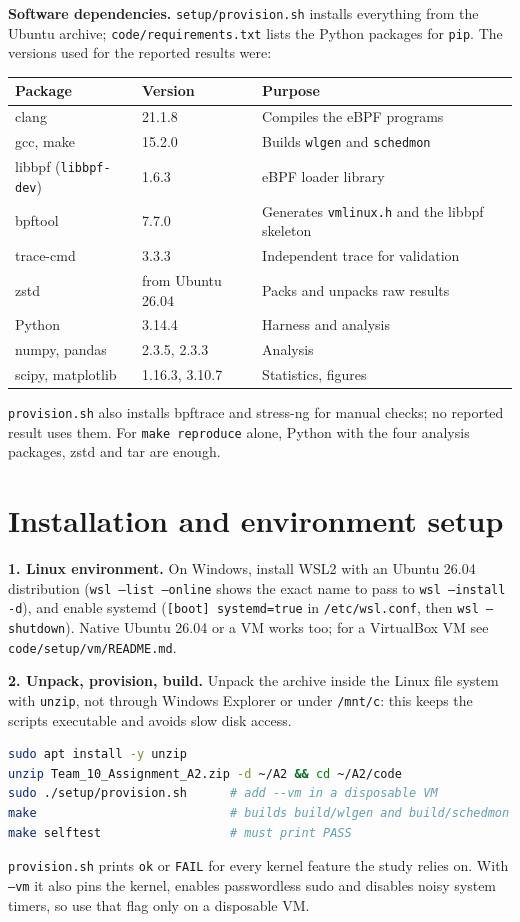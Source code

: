 \documentclass[10.5pt,a4paper]{article}
\newcommand{\f}[1]{\texttt{#1}}
\begin{document}
\textbf{Software dependencies.} \f{setup/provision.sh} installs everything from the Ubuntu archive; \f{code/requirements.txt} lists the Python packages for \f{pip}. The versions used for the reported results were:

\begin{center}
\begin{tabular}{@{}lll@{}}
\toprule
\textbf{Package} & \textbf{Version} & \textbf{Purpose} \\
\midrule
clang & 21.1.8 & Compiles the eBPF programs \\
gcc, make & 15.2.0 & Builds \f{wlgen} and \f{schedmon} \\
libbpf (\f{libbpf-dev}) & 1.6.3 & eBPF loader library \\
bpftool & 7.7.0 & Generates \f{vmlinux.h} and the libbpf skeleton \\
trace-cmd & 3.3.3 & Independent trace for validation \\
zstd & from Ubuntu 26.04 & Packs and unpacks raw results \\
Python & 3.14.4 & Harness and analysis \\
numpy, pandas & 2.3.5, 2.3.3 & Analysis \\
scipy, matplotlib & 1.16.3, 3.10.7 & Statistics, figures \\
\bottomrule
\end{tabular}
\end{center}

\f{provision.sh} also installs bpftrace and stress-ng for manual checks; no reported result uses them. For \f{make reproduce} alone, Python with the four analysis packages, zstd and tar are enough.

\section{Installation and environment setup}\label{sec:setup}
\textbf{1. Linux environment.} On Windows, install WSL2 with an Ubuntu 26.04 distribution (\f{wsl --list --online} shows the exact name to pass to \f{wsl --install -d}), and enable systemd (\f{[boot] systemd=true} in \f{/etc/wsl.conf}, then \f{wsl --shutdown}). Native Ubuntu 26.04 or a VM works too; for a VirtualBox VM see \f{code/setup/vm/README.md}.

\textbf{2. Unpack, provision, build.} Unpack the archive inside the Linux file system with \f{unzip}, not through Windows Explorer or under \f{/mnt/c}: this keeps the scripts executable and avoids slow disk access.
\begin{lstlisting}[language=bash]
sudo apt install -y unzip
unzip Team_10_Assignment_A2.zip -d ~/A2 && cd ~/A2/code
sudo ./setup/provision.sh      # add --vm in a disposable VM
make                           # builds build/wlgen and build/schedmon
make selftest                  # must print PASS
\end{lstlisting}
\f{provision.sh} prints \f{ok} or \f{FAIL} for every kernel feature the study relies on. With \f{--vm} it also pins the kernel, enables passwordless sudo and disables noisy system timers, so use that flag only on a disposable VM.
\end{document}
